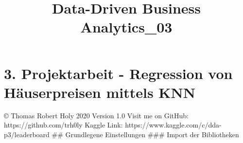 \documentclass[paper=landscape]{scrartcl}
\title{Data-Driven Business Analytics\_03}
\begin{document}
    
    \maketitle
    
    

    
    \hypertarget{projektarbeit---regression-von-huxe4userpreisen-mittels-knn}{%
\section{3. Projektarbeit - Regression von Häuserpreisen mittels
KNN}\label{projektarbeit---regression-von-huxe4userpreisen-mittels-knn}}

© Thomas Robert Holy 2020 Version 1.0 Visit me on GitHub:
https://github.com/trh0ly Kaggle Link:
https://www.kaggle.com/c/dda-p3/leaderboard \#\# Grundlegene
Einstellungen \#\#\# Import der Bibliotheken
\end{document}
